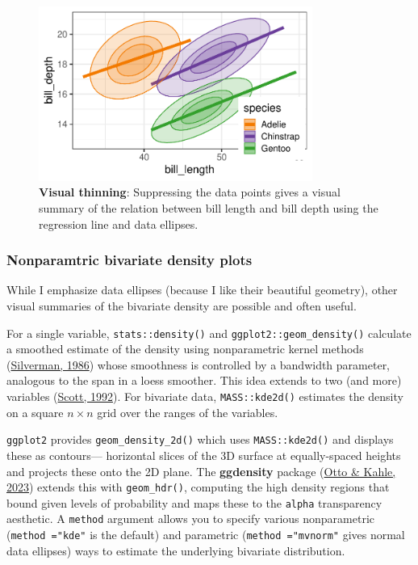 \documentclass[
  letterpaper,
  10pt,
  krantz2]{krantz}
\begin{document}
\begin{figure}[H]

{\centering \includegraphics[width=0.8\textwidth,height=\textheight]{figs/ch03/fig-peng-ggplot2-1.pdf}

}

\caption{\label{fig-peng-ggplot2}\textbf{Visual thinning}: Suppressing
the data points gives a visual summary of the relation between bill
length and bill depth using the regression line and data ellipses.}

\end{figure}

\hypertarget{nonparamtric-bivariate-density-plots}{%
\subsubsection{Nonparamtric bivariate density
plots}\label{nonparamtric-bivariate-density-plots}}

While I emphasize data ellipses (because I like their beautiful
geometry), other visual summaries of the bivariate density are possible
and often useful.

For a single variable, \texttt{stats::density()} and
\texttt{ggplot2::geom\_density()} calculate a smoothed estimate of the
density using nonparametric kernel methods
(\protect\hyperlink{ref-Silverman:86}{Silverman, 1986}) whose smoothness
is controlled by a bandwidth parameter, analogous to the span in a loess
smoother. This idea extends to two (and more) variables
(\protect\hyperlink{ref-Scott1992}{Scott, 1992}). For bivariate data,
\texttt{MASS::kde2d()} estimates the density on a square \(n \times n\)
grid over the ranges of the variables.

\texttt{ggplot2} provides \texttt{geom\_density\_2d()} which uses
\texttt{MASS::kde2d()} and displays these as contours--- horizontal
slices of the 3D surface at equally-spaced heights and projects these
onto the 2D plane. The \textbf{ggdensity} package
(\protect\hyperlink{ref-R-ggdensity}{Otto \& Kahle, 2023}) extends this
with \texttt{geom\_hdr()}, computing the high density regions that bound
given levels of probability and maps these to the \texttt{alpha}
transparency aesthetic. A \texttt{method} argument allows you to specify
various nonparametric (\texttt{method\ ="kde"} is the default) and
parametric (\texttt{method\ ="mvnorm"} gives normal data ellipses) ways
to estimate the underlying bivariate distribution.
\end{document}
